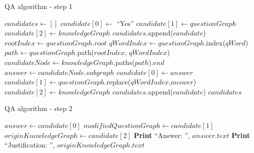 \documentclass[12pt]{article}
\begin{document}
\begin{algorithm}
\caption{QA algorithm - step 1}\label{QAalgo1}
\begin{algorithmic}
\State $candidates \gets []$
\State $candidate[0] \gets$ ``Yes''
\State $candidate[1] \gets questionGraph$
\State $candidate[2] \gets knowledgeGraph$
\State $candidates$.append($candidate$)
\EndIf
\EndFor
{}
\State $rootIndex \gets questionGraph.root$
\State $qWordIndex \gets questionGraph$.index($qWord$)
\State $path \gets questionGraph$.path($rootIndex$, $qWordIndex$)
\State $candidateNode \gets knowledgeGraph$.paths($path$).$end$
\State $answer \gets candidateNode.subgraph$
\State $candidate[0] \gets answer$
\State $candidate[1] \gets questionGraph$.replace($qWordIndex$,$answer$)
\State $candidate[2] \gets knowledgeGraph$
\State $candidates$.append($candidate$)
\EndIf
\EndFor
\EndIf
\Return $candidates$
\EndProcedure
\end{algorithmic}
\end{algorithm}

\begin{algorithm}
\caption{QA algorithm - step 2}\label{QAalgo2}
\begin{algorithmic}
\State $answer \gets candidate[0]$
\State $modifiedQuestionGraph \gets candidate[1]$
\State $originKnowledgeGraph \gets candidate[2]$
\State \textbf{Print} ``Answer: '', $answer.text$
\State \textbf{Print} ``Justification: '', $originKnowledgeGraph.text$
\EndIf
\EndFor
\EndProcedure
\end{algorithmic}
\end{algorithm}
\end{document}
